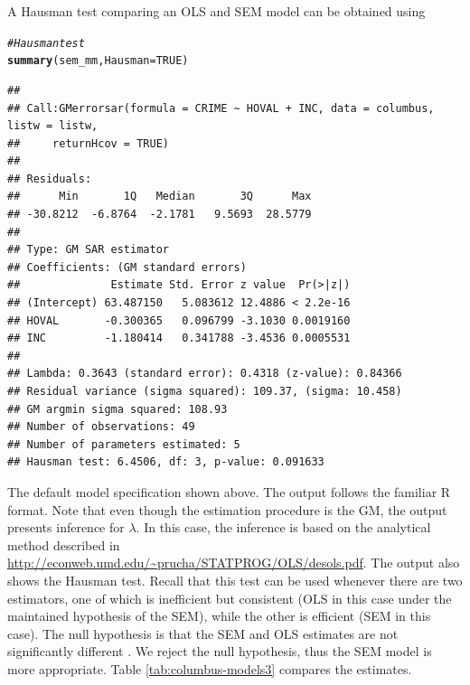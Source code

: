 \documentclass[english,12pt]{book}\usepackage[]{graphicx}\usepackage[]{xcolor}
\makeatletter
\newcommand{\hlnum}[1]{\textcolor[rgb]{0.686,0.059,0.569}{#1}}%
\newcommand{\hlcom}[1]{\textcolor[rgb]{0.678,0.584,0.686}{\textit{#1}}}%
\newcommand{\hlstd}[1]{\textcolor[rgb]{0.345,0.345,0.345}{#1}}%
\newcommand{\hlkwc}[1]{\textcolor[rgb]{0.333,0.667,0.333}{#1}}%
\newcommand{\hlkwd}[1]{\textcolor[rgb]{0.737,0.353,0.396}{\textbf{#1}}}%
\newenvironment{kframe}{%
 \def\at@end@of@kframe{}%
 \ifinner\ifhmode%
  \def\at@end@of@kframe{\end{minipage}}%
  \begin{minipage}{\columnwidth}%
 \fi\fi%
 \def\FrameCommand##1{\hskip\@totalleftmargin \hskip-\fboxsep
 \colorbox{shadecolor}{##1}\hskip-\fboxsep
     \hskip-\linewidth \hskip-\@totalleftmargin \hskip\columnwidth}%
 \MakeFramed {\advance\hsize-\width
   \@totalleftmargin\z@ \linewidth\hsize
   \@setminipage}}%
 {\par\unskip\endMakeFramed%
 \at@end@of@kframe}
\newenvironment{knitrout}{}{} %
\makeatother
\begin{document}
A Hausman test comparing an OLS and SEM model can be obtained using
\begin{knitrout}
\color{fgcolor}\begin{kframe}
\begin{alltt}
\hlcom{# Hausman test}
\hlkwd{summary}\hlstd{(sem_mm,} \hlkwc{Hausman} \hlstd{=} \hlnum{TRUE}\hlstd{)}
\end{alltt}
\begin{verbatim}
## 
## Call:GMerrorsar(formula = CRIME ~ HOVAL + INC, data = columbus, listw = listw, 
##     returnHcov = TRUE)
## 
## Residuals:
##      Min       1Q   Median       3Q      Max 
## -30.8212  -6.8764  -2.1781   9.5693  28.5779 
## 
## Type: GM SAR estimator
## Coefficients: (GM standard errors) 
##              Estimate Std. Error z value  Pr(>|z|)
## (Intercept) 63.487150   5.083612 12.4886 < 2.2e-16
## HOVAL       -0.300365   0.096799 -3.1030 0.0019160
## INC         -1.180414   0.341788 -3.4536 0.0005531
## 
## Lambda: 0.3643 (standard error): 0.4318 (z-value): 0.84366
## Residual variance (sigma squared): 109.37, (sigma: 10.458)
## GM argmin sigma squared: 108.93
## Number of observations: 49 
## Number of parameters estimated: 5 
## Hausman test: 6.4506, df: 3, p-value: 0.091633
\end{verbatim}
\end{kframe}
\end{knitrout}

The default model specification shown above. The output follows the familiar R format. Note that even though the estimation procedure is the GM, the output presents inference for $\lambda$. In this case, the inference is based on the analytical method described in \url{http://econweb.umd.edu/~prucha/STATPROG/OLS/desols.pdf}. The output also shows the Hausman test. Recall that this test can be used whenever there are two estimators, one of which is inefficient but consistent (OLS in this case under the maintained hypothesis of the SEM), while the other is efficient (SEM in this case).  The null hypothesis is that the SEM and OLS estimates are not significantly different \citep[see][pag. 62]{lesage2010introduction}. We reject the null hypothesis, thus the SEM model is more appropriate. Table \ref{tab:columbus-models3} compares the estimates. 
\end{document}
